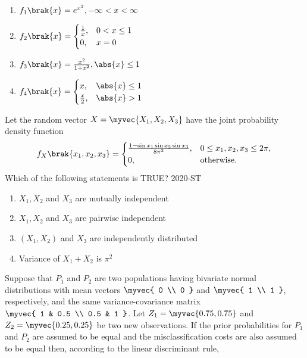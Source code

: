 \begin{enumerate}
    \item $f_1\brak{x} = e^{x^2}, -\infty < x < \infty$
    \item $f_2\brak{x} = \begin{cases} \frac{1}{x}, & 0 < x \leq 1 \\ 0, & x = 0 \end{cases}$
    \item $f_3\brak{x} = \frac{x^2}{1 + x^2}, \abs{x} \leq 1$
    \item $f_4\brak{x} = \begin{cases} x, & \abs{x} \leq 1 \\ \frac{x}{2}, & \abs{x} > 1 \end{cases}$
\end{enumerate}
\item Let the random vector $X = \myvec{X_1, X_2, X_3}$ have the joint probability density function
\begin{align*}
f_X\brak{x_1, x_2, x_3} = \begin{cases}
\frac{1 - \sin x_1 \sin x_2 \sin x_3}{8 \pi^3}, & 0 \leq x_1, x_2, x_3 \leq 2 \pi, \\
0, & \text{otherwise}.
\end{cases}
\end{align*}
Which of the following statements is TRUE?
\hfill{2020-ST}
\begin{enumerate}
    \item $X_1, X_2$ and $X_3$ are mutually independent
    \item $X_1, X_2$ and $X_3$ are pairwise independent
    \item $(X_1, X_2)$ and $X_3$ are independently distributed
    \item Variance of $X_1 + X_2$ is $\pi^2$
\end{enumerate}

\item Suppose that $P_1$ and $P_2$ are two populations having bivariate normal distributions with mean vectors $\myvec{ 0 \\ 0 }$ and $\myvec{ 1 \\ 1 }$, respectively, and the same variance-covariance matrix $\myvec{ 1 & 0.5 \\ 0.5 & 1 }$. Let $Z_1 = \myvec{0.75, 0.75}$ and $Z_2 = \myvec{0.25, 0.25}$ be two new observations. If the prior probabilities for $P_1$ and $P_2$ are assumed to be equal and the misclassification costs are also assumed to be equal then, according to the linear discriminant rule,

